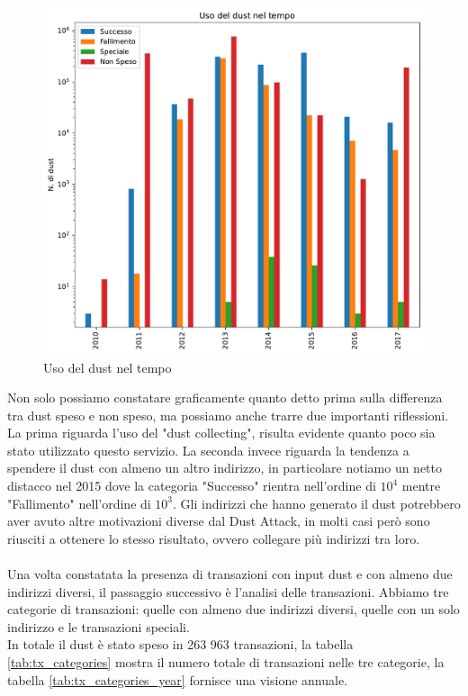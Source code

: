 \begin{figure}[h!]
    \centering
    \includegraphics[scale=0.7]{Grafici/uso_del_dust_new.pdf}
    \caption{Uso del dust nel tempo}
    \label{fig:dust_year}
\end{figure}
\FloatBarrier
Non solo possiamo constatare graficamente quanto detto prima sulla differenza tra dust speso e non speso, ma possiamo anche trarre due importanti riflessioni. La prima riguarda l'uso del "dust collecting", risulta evidente quanto poco sia stato utilizzato questo servizio. La seconda invece riguarda la tendenza a spendere il dust con almeno un altro indirizzo, in particolare notiamo un netto distacco nel 2015 dove la categoria "Successo" rientra nell'ordine di $10^4$ mentre "Fallimento" nell'ordine di $10^3$. Gli indirizzi che hanno generato il dust potrebbero aver avuto altre motivazioni diverse dal Dust Attack, in molti casi però sono riusciti a ottenere lo stesso risultato, ovvero collegare più indirizzi tra loro.\\\\
Una volta constatata la presenza di transazioni con input dust e con almeno due indirizzi diversi, il passaggio successivo è l'analisi delle transazioni. Abbiamo tre categorie di transazioni: quelle con almeno due indirizzi diversi, quelle con un solo indirizzo e le transazioni speciali.\\
In totale il dust è stato speso in 263 963 transazioni, la tabella \ref{tab:tx_categories} mostra il numero totale di transazioni nelle tre categorie, la tabella \ref{tab:tx_categories_year} fornisce una visione annuale. 
